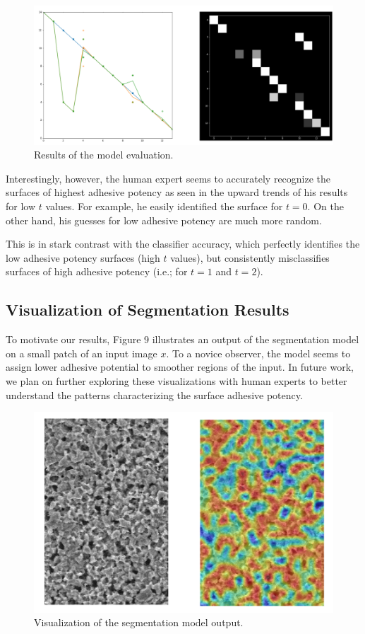 \documentclass[10pt,twocolumn,letterpaper]{article}
\begin{document}
\begin{figure}[h]
	\centering
	\includegraphics[width=0.9\linewidth]{"./figures/Figure8"}
	\caption{
		Results of the model evaluation.
	}
\end{figure}

Interestingly, however, the human expert seems to accurately recognize 
the surfaces of highest adhesive potency as seen in the upward trends of his results 
for low $t$ values. For example, he easily identified the surface for $t=0$.
On the other hand, his guesses for low adhesive potency are much more random.

This is in stark contrast with the classifier accuracy, which perfectly identifies
the low adhesive potency surfaces (high $t$ values), but consistently misclassifies 
surfaces of high adhesive potency (i.e.; for $t=1$ and $t=2$).

\subsection{Visualization of Segmentation Results}

To motivate our results, Figure 9 illustrates an output of the segmentation model on a small patch of an input image $x$.
To a novice observer, the model seems to assign lower adhesive potential to smoother regions of the input.
In future work, we plan on further exploring these visualizations with human experts to better understand the 
patterns characterizing the surface adhesive potency.

\begin{figure}[h]
	\centering
	\includegraphics[width=0.9\linewidth]{"./figures/Figure9"}
	\caption{
		Visualization of the segmentation model output.
	}
\end{figure}
\end{document}
